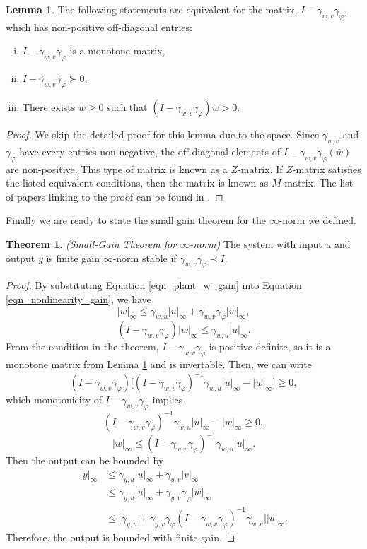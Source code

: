 \documentclass[journal]{IEEEtran}
\theoremstyle{definition}
\newtheorem{theorem}{Theorem}
\newtheorem{lemma}{Lemma}
\begin{document}
\begin{lemma}
The following statements are equivalent for the matrix, $I-\gamma_{w,v}\gamma_\varphi$, which has non-positive off-diagonal entries:
\begin{enumerate}[(i)]
\item $I-\gamma_{w,v}\gamma_\varphi$ is a monotone matrix,
\item $I-\gamma_{w,v}\gamma_\varphi\succ 0$,
\item There exists $\bar{w}\geq0$ such that $(I-\gamma_{w,v}\gamma_\varphi)\bar{w}>0$.
\end{enumerate}
\label{lemma_Zmatrix}
\end{lemma}

\begin{proof}
We skip the detailed proof for this lemma due to the space. Since $\gamma_{w,v}$ and $\gamma_\varphi$ have every entries non-negative, the off-diagonal elements of $I-\gamma_{w,v}\gamma_\varphi(\bar{w})$ are non-positive. This type of matrix is known as a $Z$-matrix. If $Z$-matrix satisfies the listed equivalent conditions, then the matrix is known as $M$-matrix. The list of papers linking to the proof can be found in \cite{plemmons77}. 
\end{proof}

Finally we are ready to state the small gain theorem for the $\infty$-norm we defined.
\begin{theorem}
\textit{(Small-Gain Theorem for $\infty$-norm)} The system with input $u$ and output $y$ is finite gain $\infty$-norm stable if  $\gamma_{w,v}\gamma_\varphi\prec I$.
\end{theorem}

\begin{proof}
By substituting Equation \ref{eqn_plant_w_gain} into Equation \ref{eqn_nonlinearity_gain}, we have
$$|w|_\infty\leq\gamma_{w,u} |u|_\infty+\gamma_{w,v}\gamma_\varphi |w|_\infty,$$
$$(I-\gamma_{w,v}\gamma_\varphi)|w|_\infty\leq\gamma_{w,u} |u|_\infty.$$
From the condition in the theorem, $I-\gamma_{w,v}\gamma_\varphi$ is positive definite, so it is a monotone matrix from Lemma \ref{lemma_Zmatrix} and is invertable. Then, we can write
$$(I-\gamma_{w,v}\gamma_\varphi)\big[(I-\gamma_{w,v}\gamma_\varphi)^{-1}\gamma_{w,u} |u|_\infty-|w|_\infty\big]\geq0,$$
which monotonicity of $I-\gamma_{w,v}\gamma_\varphi$ implies
$$(I-\gamma_{w,v}\gamma_\varphi)^{-1}\gamma_{w,u} |u|_\infty-|w|_\infty\geq0,$$
$$|w|_\infty\leq(I-\gamma_{w,v}\gamma_\varphi)^{-1}\gamma_{w,u} |u|_\infty.$$
Then the output can be bounded by
$$\begin{aligned} 
|y|_\infty&\leq\gamma_{y,u} |u|_\infty+\gamma_{y,v}|v|_\infty \\
&\leq\gamma_{y,u} |u|_\infty+\gamma_{y,v}\gamma_\varphi |w|_\infty \\ 
&\leq\big[\gamma_{y,u}+\gamma_{y,v}\gamma_\varphi (I-\gamma_{w,v}\gamma_\varphi)^{-1}\gamma_{w,u}\big] |u|_\infty.
\end{aligned}$$
Therefore, the output is bounded with finite gain.
\end{proof}
\end{document}
